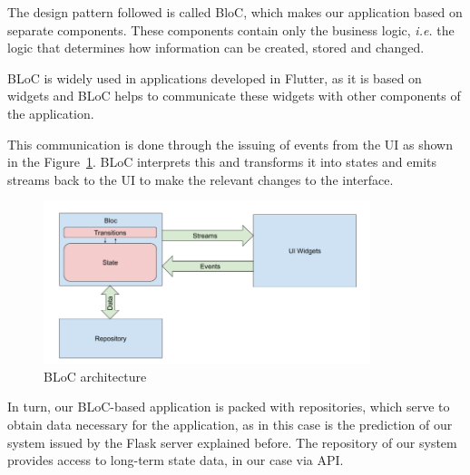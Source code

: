 The design pattern followed is called BloC, which makes our application based on separate components. These components contain only the business logic, \textit{i.e.} the logic that determines how information can be created, stored and changed.

BLoC is widely used in applications developed in Flutter, as it is based on widgets and BLoC helps to communicate these widgets with other components of the application.

This communication is done through the issuing of events from the UI as shown in the Figure~\ref{fig:bloc}. BLoC interprets this and transforms it into states and emits streams back to the UI to make the relevant changes to the interface. 

\begin{figure}[h]
    \centering
    \includegraphics[width=0.85\textwidth]{img/architecture/bloc.png}
    \caption{BLoC architecture}
    \label{fig:bloc}
\end{figure}

In turn, our BLoC-based application is packed with repositories, which serve to obtain data necessary for the application, as in this case is the prediction of our system issued by the Flask server explained before. The repository of our system provides access to long-term state data, in our case via API.

